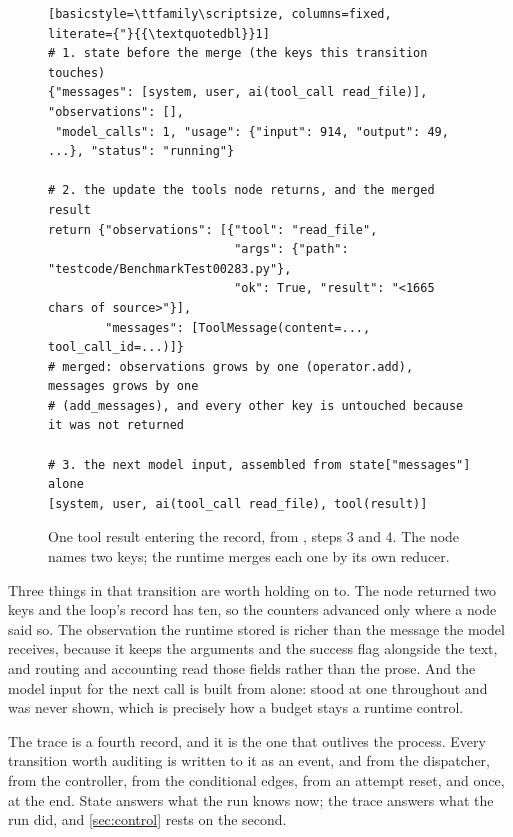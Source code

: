 \begin{figure}[htbp]
\begin{lstlisting}[basicstyle=\ttfamily\scriptsize, columns=fixed,
literate={"}{{\textquotedbl}}1]
# 1. state before the merge (the keys this transition touches)
{"messages": [system, user, ai(tool_call read_file)], "observations": [],
 "model_calls": 1, "usage": {"input": 914, "output": 49, ...}, "status": "running"}

# 2. the update the tools node returns, and the merged result
return {"observations": [{"tool": "read_file",
                          "args": {"path": "testcode/BenchmarkTest00283.py"},
                          "ok": True, "result": "<1665 chars of source>"}],
        "messages": [ToolMessage(content=..., tool_call_id=...)]}
# merged: observations grows by one (operator.add), messages grows by one
# (add_messages), and every other key is untouched because it was not returned

# 3. the next model input, assembled from state["messages"] alone
[system, user, ai(tool_call read_file), tool(result)]
\end{lstlisting}
  \caption{One tool result entering the record, from , steps 3
  and 4. The node names two keys; the runtime merges each one by its own reducer.}
  \label{fig:state-views}
\end{figure}

Three things in that transition are worth holding on to. The node returned two keys and the
loop's record has ten, so the counters advanced only where a node said so. The observation the runtime
stored is richer than the message the model receives, because it keeps the arguments and the
success flag alongside the text, and routing and accounting read those fields rather than the
prose. And the model input for the next call is built from  alone:
 stood at one throughout and was never shown, which is precisely how a
budget stays a runtime control.

The trace is a fourth record, and it is the one that outlives the process. Every transition worth
auditing is written to it as an event,  and  from the
dispatcher,  from the controller,  from the conditional
edges,  from an attempt reset, and  once, at the end.
State answers what the run knows now; the trace answers what the run did, and
\cref{sec:control} rests on the second.

